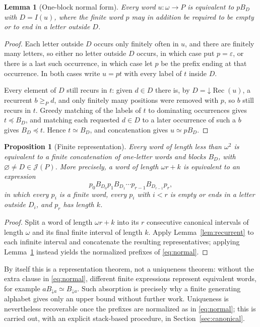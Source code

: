 \documentclass[11pt,a4paper]{article}
\numberwithin{equation}{section}
\newtheorem{lemma}[theorem]{Lemma}
\newtheorem{proposition}[theorem]{Proposition}
\theoremstyle{definition}
\theoremstyle{remark}
\newcommand{\J}{\mathcal J}
\newcommand{\eps}{\varepsilon}
\newcommand{\down}{\mathord{\downarrow}}
\newcommand{\emb}{\preccurlyeq}
\newcommand{\eqv}{\simeq}
\newcommand{\rec}{\operatorname{Rec}}
\begin{document}
\begin{lemma}[One-block normal form]\label{lem:oneblock}
Every word $u:\omega\to P$ is equivalent to $pB_D$ with $D=I(u)$, where the
finite word $p$ may in addition be required to be empty or to end in a letter
outside $D$.
\end{lemma}
\begin{proof}
Each letter outside $D$ occurs only finitely often in $u$, and there are
finitely many letters, so either no letter outside $D$ occurs, in which case
put $p=\eps$, or there is a last such occurrence, in which case let $p$ be the
prefix ending at that occurrence. In both cases write $u=pt$ with every label
of $t$ inside $D$.

Every element of $D$ still recurs in $t$: given $d\in D$ there is, by
$D=\down\rec(u)$, a recurrent $b\ge_P d$, and only finitely many positions
were removed with $p$, so $b$ still recurs in $t$. Greedy matching of the
labels of $t$ to dominating occurrences gives $t\emb B_D$, and matching each
requested $d\in D$ to a later occurrence of such a $b$ gives $B_D\emb t$.
Hence $t\eqv B_D$, and concatenation gives $u\eqv pB_D$.
\end{proof}

\begin{proposition}[Finite representation]\label{prop:representation}
Every word of length less than $\omega^2$ is equivalent to a finite
concatenation of one-letter words and blocks $B_D$, with
$\varnothing\ne D\in\J(P)$. More precisely, a word of length $\omega r+k$ is
equivalent to an expression
\begin{equation}\label{eq:normal}
 p_0B_{D_0}p_1B_{D_1}\cdots p_{r-1}B_{D_{r-1}}p_r,
\end{equation}
in which every $p_i$ is a finite word, every $p_i$ with $i<r$ is empty or ends
in a letter outside $D_i$, and $p_r$ has length $k$.
\end{proposition}
\begin{proof}
Split a word of length $\omega r+k$ into its $r$ consecutive canonical
intervals of length $\omega$ and its final finite interval of length $k$.
Apply Lemma~\ref{lem:recurrent} to each infinite interval and concatenate the
resulting representatives; applying Lemma~\ref{lem:oneblock} instead yields
the normalized prefixes of \eqref{eq:normal}.
\end{proof}

By itself this is a representation theorem, not a uniqueness theorem: without
the extra clause in \eqref{eq:normal}, different finite expressions represent
equivalent words, for example $aB_{\down a}\eqv B_{\down a}$. Such absorption
is precisely why a finite generating alphabet gives only an upper bound
without further work. Uniqueness is nevertheless recoverable once the prefixes
are normalized as in \eqref{eq:normal}; this is carried out, with an explicit
stack-based procedure, in Section~\ref{sec:canonical}.
\end{document}
